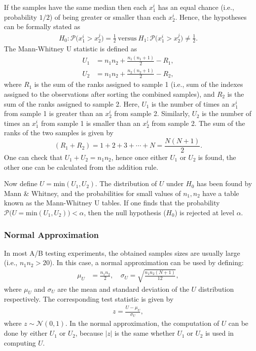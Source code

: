 \documentclass[10pt, aps,twocolumn, superscriptaddress, nofootinbib]{revtex4-2}
\begin{document}
 If the samples have the same median then each $x_1^i$ has an equal chance (i.e., probability $1/2$) of being greater or smaller than each $x_2^i$. Hence, the hypotheses can be formally stated as
 \begin{align}
	H_0: \mathcal{P}\big(x_1^i > x_2^j\big) =\frac{1}{2}~\text{versus}~ H_1: \mathcal{P}\big(x_1^i > x_2^j\big) \neq \frac{1}{2}.
	\label{eqnu}
\end{align}
The Mann-Whitney U statistic is defined as
\begin{align}
U_1 &= n_1n_2 + \frac{ n_1(n_1+1)}{2} - R_1,\\
U_2 &= n_1n_2 + \frac{ n_2(n_2+1)}{2} - R_2,
\end{align}
where  $R_1$ is the sum of the ranks  assigned to sample 1 (i.e., sum of the indexes assigned to the observations after sorting the combined samples), and $R_2$ is the sum of the ranks assigned to sample 2. Here, $U_1$  is the  number of times an  $x_1^i$ from sample 1 is greater than an  $x_2^i$ from sample 2. Similarly,  $U_2$  is the  number of times an  $x_1^i$ from sample 1 is smaller than an  $x_2^i$  from sample 2. The sum of the ranks of the two samples is given by
 \begin{equation}
 (R_1+R_2) = 1+2+3+\cdots+N= \frac{N(N+1)}{2}.
 \end{equation}
 One can check that $U_1+U_2 = n_1n_2$, hence once either $U_1$ or $U_2$ is found, the other one can be calculated from the addition rule. 

Now define $U=\text{min}(U_1,U_2)$. The distribution of $U$ under $H_0$ has been found by Mann \& Whitney,  and the probabilities for small values of $n_1,n_2$ have a table known as the Mann-Whitney U tables. If one finds that the probability $\mathcal{P}\big(U=\text{min}(U_1,U_2)\big)<\alpha$, then the null hypothesis ($H_0$) is rejected at level $ \alpha$.

\subsubsection {Normal Approximation} 
In most A/B testing experiments, the obtained samples sizes are usually large (i.e., $n_1n_2 >20$). In this case, a normal approximation can be used by defining:
 \begin{align}
	\mu_U &= \frac{n_1n_2}{2},\quad \sigma_U =\sqrt{ \frac{n_1n_2(N+1)}{12}},
	\label{tt}
\end{align}
where $\mu_U$  and $\sigma_U$ are the mean and standard deviation of  the $U$ distribution respectively.  The corresponding test statistic is given by
 \begin{align}
	z = \frac{U -\mu_U}{\sigma_U},
\end{align}
where $z\sim \mathcal{N}(0,1)$. In the normal approximation, the computation of $U$ can be done by either $U_1$ or $U_2$,  because $|z|$ is the same whether  $U_1$ or $U_2$ is used in computing $U$.
\end{document}
